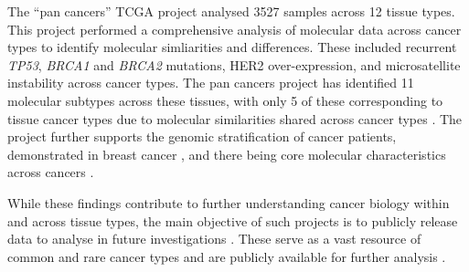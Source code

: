 The ``\glspl{pan cancer}'' \gls{TCGA} project \citep{TCGA2013PAN,TCGA2014PAN} analysed 3527 samples across 12 tissue types.  %
This project performed a comprehensive analysis of molecular data across cancer types to identify molecular simliarities and differences.
These included recurrent \textit{TP53}, \textit{BRCA1} and \textit{BRCA2} \glspl{mutation}, HER2 over-expression, and microsatellite instability across cancer types.
The \glspl{pan cancer} project has identified 11 \glspl{molecular subtype} across these tissues, with only 5 of these corresponding to tissue cancer types due to molecular similarities shared across cancer types \citep{TCGA2014PAN} . %
The project further supports the \gls{genomic} stratification of cancer patients, demonstrated in breast cancer \citep{Perou2000, Parker2009, METABRIC2016}, and there being core molecular characteristics across cancers \citep{Hanahan2000, Hanahan2011}.

While these findings contribute to further understanding cancer biology within and across tissue types, the main objective of such projects is to publicly release data to analyse in future investigations \citep{TCGA2008GBM, TCGA2013PAN, TCGA2017web}. These serve as a vast resource of common and rare cancer types and are publicly available for further analysis \citep{cBioPortal, TCGA2017web, ICGC2011}. %


